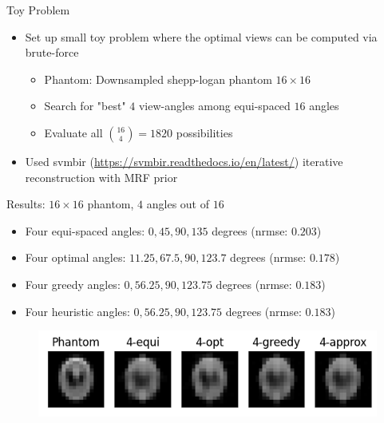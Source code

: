 \documentclass[english,aspectratio=43]{beamer}
\begin{document}
\begin{frame}{Toy Problem}
	\begin{itemize}
	    \setlength\itemsep{2em}
		\item Set up small toy problem where the optimal views can be computed via brute-force
		\begin{itemize}
		    \item Phantom: Downsampled shepp-logan phantom $16\times16$
		    \item Search for "best" $4$ view-angles among equi-spaced $16$ angles
		    \item Evaluate all ${16 \choose 4} = 1820$ possibilities
	    \end{itemize}
		
		
	    \item Used svmbir (\url{https://svmbir.readthedocs.io/en/latest/}) iterative reconstruction with MRF prior
	    
        
	\end{itemize}
	
\end{frame}


\begin{frame}{Results: $16 \times 16$ phantom, $4$ angles out of $16$ }
	\begin{itemize}
	    \item Four equi-spaced angles: $0, 45, 90, 135$ degrees (nrmse: $0.203$)
	    \item Four optimal angles: $11.25, 67.5, 90, 123.7$ degrees (nrmse: $0.178$)
	    \item Four greedy angles: $0, 56.25, 90, 123.75$ degrees (nrmse: $0.183$)
	    \item Four heuristic angles: $0, 56.25, 90, 123.75$ degrees (nrmse: $0.183$)
        
	\end{itemize}
	
	\begin{figure}
    \includegraphics[scale=0.9]{Figs/plot_recon_compare3_16-16-4.png}
    \end{figure}
	
\end{frame}
\end{document}
